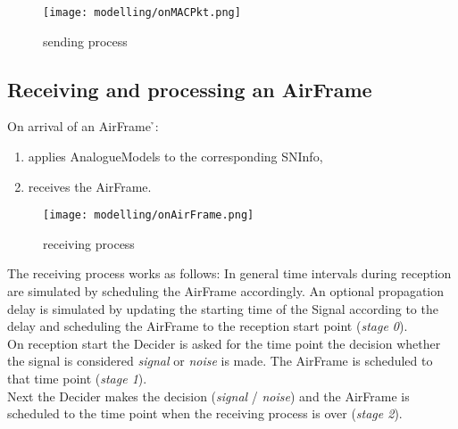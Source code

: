 \begin{figure}[H]
 \centering
 \texttt{[image: modelling/onMACPkt.png]}
 \caption{sending process}
 \label{fig: sending process}
\end{figure}





\subsection{Receiving and processing an AirFrame}

On arrival of an AirFrame \h{\bp}:
\begin{enumerate}
	
	\item applies AnalogueModels to the corresponding SNInfo,
	\item receives the AirFrame.
\end{enumerate}

\begin{figure}[H]
 \centering
 \texttt{[image: modelling/onAirFrame.png]}
 \caption{receiving process}
 \label{fig: receiving process}
\end{figure}


The receiving process works as follows: In general time intervals during reception are simulated by scheduling the AirFrame accordingly.
An optional propagation delay is simulated by updating the starting time of the Signal according to the delay and scheduling the AirFrame to the reception start point (\textit{stage 0}).\\

On reception start the Decider is asked for the time point the decision whether the signal is considered \textit{signal} or \textit{noise} is made. The AirFrame is scheduled to that time point (\textit{stage 1}).\\

Next the Decider makes the decision (\textit{signal} / \textit{noise}) and the AirFrame is scheduled to the time point when the receiving process is over (\textit{stage 2}).\\

